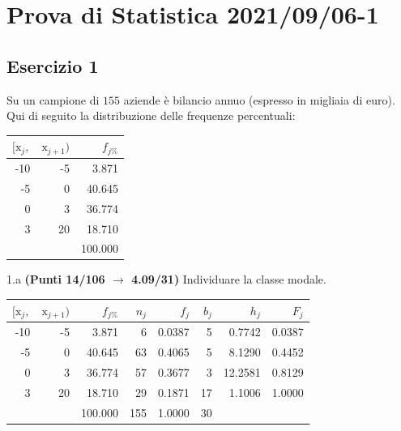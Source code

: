 \documentclass[
  11pt,
]{book}
\theoremstyle{mytheoremstyle}
\theoremstyle{mydefstyle}
\newenvironment{sol}
  {
  \begin{tcolorbox}[enhanced,breakable,arc=0.1mm,boxrule=1pt,colback=white,colframe=iblue,
  title=\bf \fontfamily{lmss}\selectfont \hspace{.5 cm} Soluzione,drop fuzzy shadow]

}{
\end{tcolorbox}
  }
\begin{document}
\section{Prova di Statistica 2021/09/06-1}\label{prova-di-statistica-20210906-1}

\subsection{Esercizio 1}\label{esercizio-1-10}

Su un campione di \(155\) aziende è bilancio annuo (espresso in migliaia di euro). Qui di seguito la distribuzione delle frequenze percentuali:

\begin{table}[H]
\centering
\begin{tabular}{rrr}
\toprule
$[\text{x}_j,$ & $\text{x}_{j+1})$ & $f_{j\%}$\\
\midrule
-10 & -5 & 3.871\\
-5 & 0 & 40.645\\
0 & 3 & 36.774\\
3 & 20 & 18.710\\
 &  & 100.000\\
\bottomrule
\end{tabular}
\end{table}

1.a \textbf{(Punti 14/106 \(\rightarrow\) 4.09/31)} Individuare la classe modale.

\begin{sol}

\begin{table}[H]
\centering
\begin{tabular}{rrrrrrrr}
\toprule
$[\text{x}_j,$ & $\text{x}_{j+1})$ & $f_{j\%}$ & $n_j$ & $f_j$ & $b_j$ & $h_j$ & $F_j$\\
\midrule
-10 & -5 & 3.871 & 6 & 0.0387 & 5 & 0.7742 & 0.0387\\
-5 & 0 & 40.645 & 63 & 0.4065 & 5 & 8.1290 & 0.4452\\
0 & 3 & 36.774 & 57 & 0.3677 & 3 & 12.2581 & 0.8129\\
3 & 20 & 18.710 & 29 & 0.1871 & 17 & 1.1006 & 1.0000\\
 &  & 100.000 & 155 & 1.0000 & 30 &  & \\
\bottomrule
\end{tabular}
\end{table}

\end{sol}
\end{document}
